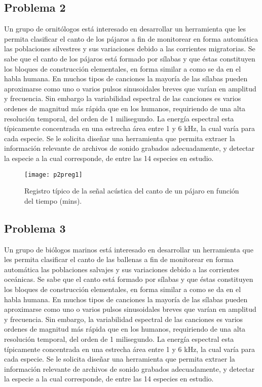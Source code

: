 \documentclass[a4paper,10pt,spanish,oneside]{article}
\begin{document}
\subsection{Problema 2}
Un grupo de ornitólogos está interesado en desarrollar un herramienta que les permita clasificar el canto de los pájaros a fin de monitorear en forma automática las poblaciones silvestres y sus variaciones debido a las corrientes migratorias. Se sabe que el canto de los pájaros está formado por sílabas y que éstas constituyen los
bloques de construcción elementales, en forma similar a como se da en el habla humana. En muchos tipos de canciones la mayoría de las sílabas pueden aproximarse como uno o varios pulsos sinusoidales breves que varían en amplitud y frecuencia. Sin embargo la variabilidad espectral de las canciones es varios ordenes de magnitud más rápida que en los humanos, requiriendo de una alta resolución temporal, del orden de 1 milisegundo. La energía espectral esta típicamente concentrada en una estrecha área entre 1 y 6 kHz, la cual varía para cada especie. Se le solicita diseñar una herramienta que permita extraer la información relevante de archivos de sonido
grabados adecuadamente, y detectar la especie a la cual corresponde, de entre las 14 especies en estudio.

\begin{figure}[!htbp]
\centerline{\texttt{[image: p2preg1]}}
\caption{Registro típico de la señal acústica del canto de un pájaro en función del tiempo (mins).}
\label{fig:p2preg1}
\end{figure}

\subsection{Problema 3}
Un grupo de biólogos marinos está interesado en desarrollar un herramienta que les permita clasificar el canto de las ballenas a fin de monitorear en forma automática las poblaciones salvajes y sus variaciones debido a las corrientes oceánicas. Se sabe que el canto está formado por sílabas y que éstas constituyen los bloques de construcción elementales, en forma similar a como se da en el habla humana. En muchos tipos de canciones la mayoría de las sílabas pueden aproximarse como uno o varios pulsos sinusoidales breves que varían en amplitud y frecuencia. Sin embargo, la variabilidad espectral de las canciones es varios ordenes de magnitud más rápida que
en los humanos, requiriendo de una alta resolución temporal, del orden de 1 milisegundo. La energía espectral esta típicamente concentrada en una estrecha área entre 1 y 6 kHz, la cual varía para cada especie. Se le solicita diseñar una herramienta que permita extraer la información relevante de archivos de sonido grabados adecuadamente, y detectar la especie a la cual corresponde, de entre las 14 especies en estudio.
\end{document}
